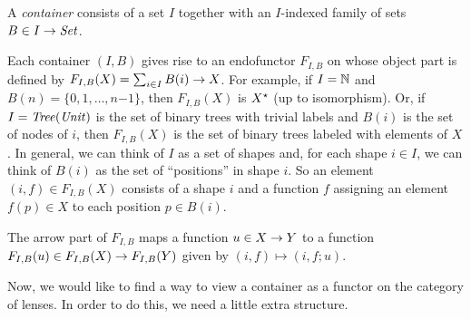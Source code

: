 \begin{defn}[$R$-similarity]
\begin{theorem}
\begin{lemma}
\begin{theorem}[No products]
\begin{lemma}
\begin{defn}
\begin{theorem}
\begin{theorem}
\begin{corollary}[Hylomorphism]
\begin{defn}[Container]
A {\em container} consists of a set $I$ together with an $I$-indexed family
of sets $B \in I \rightarrow \mathit{Set}$.  
\end{defn}

Each container $(I,B)$ gives rise to an endofunctor $F_{I,B}$ on
\SET{} whose object part is defined by $F_{I,B}(X) = \sum_{i\in I}
B(i)\rightarrow X$.  For example, if $I = \mathbb{N}$ and $B(n) =
\{0,1,\ldots,n\mathord{-}1\}$, then $F_{I,B}(X)$ is
$X^\star$ (up to isomorphism).  Or, if $I = \mathit{Tree}(\mathit{Unit})$ is the set of binary trees with
trivial labels and $B(i)$ is the set of nodes of $i$, then $F_{I,B}(X)$ is
the set of binary trees labeled with elements of $X$.
%
In general, we can think of $I$ as a
set of shapes and, for each shape $i\in I$, we can think of $B(i)$ as the
set of ``positions'' in shape $i$. So an element $(i,f) \in F_{I,B}(X)$
consists of a shape $i$ and a function $f$ assigning an element $f(p)\in X$
to each position $p\in B(i)$.
\iffull

\fi
The arrow part of $F_{I,B}$ maps a function $u\in X\rightarrow Y$ 
to a function $F_{I,B}(u) \in F_{I,B}(X) \rightarrow F_{I,B}(Y)$ given by $(i,f)
\mapsto (i,f;u)$. 

Now, we would like to find a way to view a container as a functor on the
category of lenses.  In order to do this, we need a little extra structure.


\end{corollary}
\end{theorem}
\end{theorem}
\end{defn}
\end{lemma}
\end{theorem}
\end{lemma}
\end{theorem}
\end{defn}
